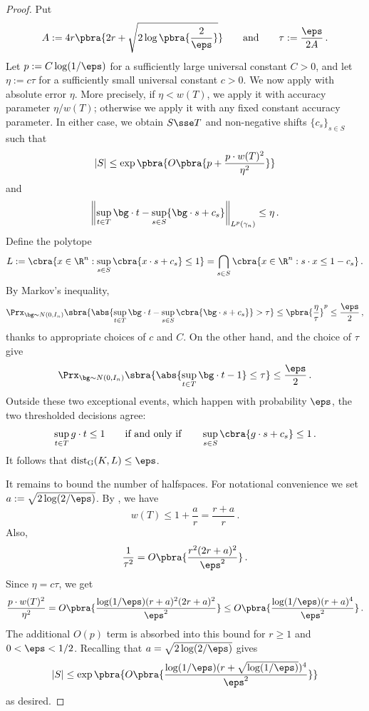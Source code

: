 \documentclass[11pt]{article}
\newcommand{\dG}{\mathrm{dist}_{\mathrm{G}}}
\begin{document}
\begin{proof}
	Put
	\[
		A:=4r\pbra{2r+\sqrt{2\log\pbra{\frac{2}{\eps}}}}
		\qquad\text{and}\qquad
		\tau:=\frac{\eps}{2A}\,.
	\]
	Let $p := C\log(1/\eps)$ for a sufficiently large universal constant $C > 0$, and let $\eta := c\tau$ for a sufficiently small universal constant $c > 0$. 
	We now apply  with absolute error $\eta$. 
	More precisely, if $\eta < w(T)$, we apply it with accuracy parameter $\eta/w(T)$; otherwise we apply it with any fixed constant accuracy parameter. 
	In either case, we obtain $S\sse T$ and non-negative shifts $\{c_s\}_{s\in S}$ such that
	\[
		|S|
		\leq
		\exp\pbra{
			O\pbra{
				p+\frac{p\cdot w(T)^2}{\eta^2}
			}
		}
	\]
	and
	\[
		\left\|
			\sup_{t\in T}\bg\cdot t
			-
			\sup_{s\in S}\{\bg\cdot s+c_s\}
		\right\|_{L^p(\gamma_n)}
		\leq
		\eta\,.
	\]
	Define the polytope
	\[
		L
		:=
		\cbra{x\in\R^n: \sup_{s\in S} \cbra{x\cdot s + c_s} \leq 1}
		=
		\bigcap_{s\in S}
		\cbra{x\in\R^n:s\cdot x\leq1-c_s}\,.
	\]
	By Markov's inequality,
	\[
		\Prx_{\bg\sim N(0,I_n)}
		\sbra{
			\abs{
				\sup_{t\in T}\bg\cdot t
				-
				\sup_{s\in S} \cbra{\bg\cdot s + c_s}
			}
			>
			\tau
		}
		\leq
		\pbra{\frac{\eta}{\tau}}^p
		\leq
		\frac{\eps}{2}\,,
	\]
	thanks to appropriate choices of $c$ and $C$. 
	On the other hand,  and the choice of $\tau$ give
	\[
		\Prx_{\bg\sim N(0,I_n)}
		\sbra{
			\abs{
				\sup_{t\in T}\bg\cdot t-1
			}
			\leq
			\tau
		}
		\leq
		\frac{\eps}{2}\,.
	\]
	Outside these two exceptional events, which happen with probability $\eps$, the two thresholded decisions agree:
	\[
		\sup_{t\in T}g\cdot t\leq 1
		\qquad\text{if and only if}\qquad
		\sup_{s\in S} \cbra{g\cdot s + c_s} \leq 1\,.
	\]
	It follows that $\dG(K,L)\leq\eps$.

	It remains to bound the number of halfspaces. 
	For notational convenience we set $a := \sqrt{2\log(2/\eps)}$. 
	By , we have 
	\[
		w(T)
		\leq
		1+\frac{a}{r}
		=
		\frac{r+a}{r}\,.
	\]
	Also,
	\[
		\frac1{\tau^2}
		=
		O\pbra{
			\frac{r^2(2r+a)^2}{\eps^2}
		}\,.
	\]
	Since $\eta=c\tau$, we get
	\[
		\frac{p\cdot w(T)^2}{\eta^2}
		=
		O\pbra{
			\frac{\log(1/\eps)(r+a)^2(2r+a)^2}{\eps^2}
		}
		\leq
		O\pbra{
			\frac{\log(1/\eps)(r+a)^4}{\eps^2}
		}\,.
	\]
	The additional $O(p)$ term is absorbed into this bound for $r\geq1$ and $0<\eps<1/2$.
	Recalling that $a=\sqrt{2\log(2/\eps)}$ gives
	\[
		|S|
		\leq
		\exp\pbra{
			O\pbra{
				\frac{\log(1/\eps)(r+\sqrt{\log(1/\eps)})^4}{\eps^2}
			}
		}
	\]
	as desired. 
\end{proof}
\end{document}
